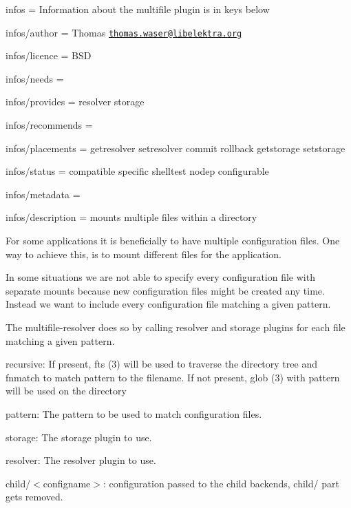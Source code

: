 
\begin{DoxyItemize}
\item infos = Information about the multifile plugin is in keys below
\item infos/author = Thomas \href{mailto:thomas.waser@libelektra.org}{\tt thomas.\+waser@libelektra.\+org}
\item infos/licence = B\+SD
\item infos/needs =
\item infos/provides = resolver storage
\item infos/recommends =
\item infos/placements = getresolver setresolver commit rollback getstorage setstorage
\item infos/status = compatible specific shelltest nodep configurable
\item infos/metadata =
\item infos/description = mounts multiple files within a directory
\end{DoxyItemize}

For some applications it is beneficially to have multiple configuration files. One way to achieve this, is to mount different files for the application.

In some situations we are not able to specify every configuration file with separate mounts because new configuration files might be created any time. Instead we want to include every configuration file matching a given pattern.

The multifile-\/resolver does so by calling resolver and storage plugins for each file matching a given pattern.


\begin{DoxyItemize}
\item {\ttfamily recursive}\+: If present, fts (3) will be used to traverse the directory tree and fnmatch to match {\ttfamily pattern} to the filename. If not present, glob (3) with {\ttfamily pattern} will be used on the directory
\item {\ttfamily pattern}\+: The pattern to be used to match configuration files.
\item {\ttfamily storage}\+: The storage plugin to use.
\item {\ttfamily resolver}\+: The resolver plugin to use.
\item \textquotesingle{}child/$<$configname$>$\textquotesingle{}\+: configuration passed to the child backends, {\ttfamily child/} part gets removed.
\end{DoxyItemize}

